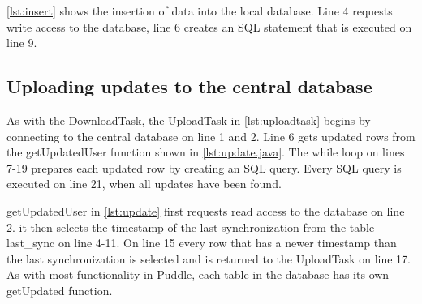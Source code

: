 

\autoref{lst:insert} shows the insertion of data into the local database. Line 4 requests write access to the database, line 6 creates an SQL statement that is executed on line 9.



\subsection{Uploading updates to the central database}
As with the DownloadTask, the UploadTask in \autoref{lst:uploadtask} begins by connecting to the central database on line 1 and 2. Line 6 gets updated rows from the getUpdatedUser function shown in \autoref{lst:update.java}. The while loop on lines 7-19 prepares each updated row by creating an SQL query. Every SQL query is executed on line 21, when all updates have been found.



getUpdatedUser in \autoref{lst:update} first requests read access to the database on line 2. it then selects the timestamp of the last synchronization from the table last\_sync on line 4-11. On line 15 every row that has a newer timestamp than the last synchronization is selected and is returned to the UploadTask on line 17. As with most functionality in Puddle, each table in the database has its own getUpdated function.

